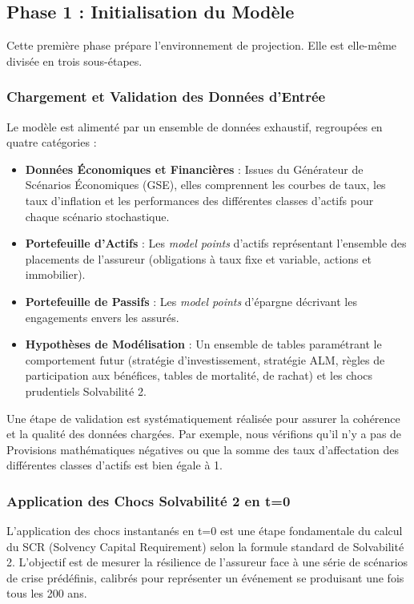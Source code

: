 \subsection{Phase 1 : Initialisation du Modèle}

Cette première phase prépare l'environnement de projection. Elle est elle-même divisée en trois sous-étapes.

\subsubsection{Chargement et Validation des Données d'Entrée}

Le modèle est alimenté par un ensemble de données exhaustif, regroupées en quatre catégories :
\begin{itemize}
\item \textbf{Données Économiques et Financières} : Issues du Générateur de Scénarios Économiques (GSE), elles comprennent les courbes de taux, les taux d'inflation et les performances des différentes classes d'actifs pour chaque scénario stochastique.
\item \textbf{Portefeuille d'Actifs} : Les \textit{model points} d'actifs représentant l'ensemble des placements de l'assureur (obligations à taux fixe et variable, actions et immobilier).
\item \textbf{Portefeuille de Passifs} : Les \textit{model points} d'épargne décrivant les engagements envers les assurés.
\item \textbf{Hypothèses de Modélisation} : Un ensemble de tables paramétrant le comportement futur (stratégie d'investissement, stratégie ALM, règles de participation aux bénéfices, tables de mortalité, de rachat) et les chocs prudentiels Solvabilité 2.
\end{itemize}
Une étape de validation est systématiquement réalisée pour assurer la cohérence et la qualité des données chargées. Par exemple, nous vérifions qu'il n'y a pas de Provisions mathématiques négatives ou que la somme des taux d'affectation des différentes classes d'actifs est bien égale à 1.

\subsubsection{Application des Chocs Solvabilité 2 en t=0}

L'application des chocs instantanés en t=0 est une étape fondamentale du calcul du SCR (Solvency Capital Requirement) selon la formule standard de Solvabilité 2. L'objectif est de mesurer la résilience de l'assureur face à une série de scénarios de crise prédéfinis, calibrés pour représenter un événement se produisant une fois tous les 200 ans.

